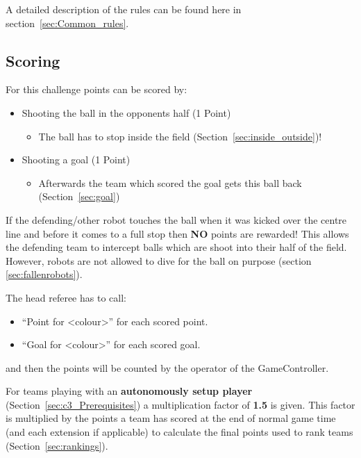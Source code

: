 A detailed description of the rules can be found here in section~\ref{sec:Common_rules}.

\subsection{Scoring}
\label{sec:scoring}

For this challenge points can be scored by:
\begin{itemize}
	\item Shooting the ball in the opponents half (1 Point)
	\begin{itemize}
		\item The ball has to stop inside the field (\cf Section~\ref{sec:inside_outside})!
	\end{itemize} 
	\item Shooting a goal (1 Point)
	\begin{itemize}
		\item Afterwards the team which scored the goal gets this ball back (\cf Section~\ref{sec:goal})
	\end{itemize}
\end{itemize}

If the defending/other robot touches the ball when it was kicked over the centre line and before it comes to a full stop then \textbf{NO} points are rewarded! This allows the defending team to intercept balls which are shoot into their half of the field. However, robots are not allowed to dive for the ball on purpose (\cf section \ref{sec:fallenrobots}).

The head referee has to call:
\begin{itemize}
	\item ``Point for \textless colour\textgreater'' for each scored point.
	\item ``Goal for \textless colour\textgreater'' for each scored goal.
\end{itemize}
and then the points will be counted by the operator of the GameController.

For teams playing with an \textbf{autonomously setup player} (\cf Section~\ref{sec:c3_Prerequisites}) a multiplication factor of \textbf{1.5} is given. This factor is multiplied by the points a team has scored at the end of normal game time (and each extension if applicable) to calculate the final points used to rank teams (\cf Section~\ref{sec:rankings}). 

